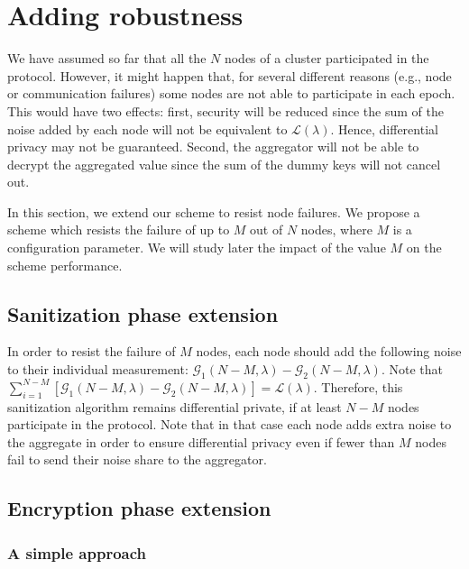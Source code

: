 \documentclass[11pt,a4paper]{article}
\theoremstyle{plain}
\theoremstyle{plain}
\theoremstyle{plain}
\theoremstyle{plain}
\theoremstyle{nonumberplain} \theoremseparator{}
\begin{document}
\section{Adding robustness}
\label{sec:robust}

We have assumed so far that all the $N$ nodes of a cluster
participated in the protocol. However, it might happen that, for
several different reasons (e.g., node or communication failures) some
nodes are not able to participate in each epoch. This would have two effects: first, 
security will be reduced since the sum of the noise added by each node will not be 
equivalent to $\mathcal{L}(\lambda)$. Hence, differential privacy may not be guaranteed.
Second, the aggregator will not be able to decrypt the aggregated value since the sum of 
the dummy keys will not cancel out.

In this section, we extend our scheme to resist node failures. We propose
a scheme which resists the failure of up to $M$ out of $N$ nodes, 
where $M$ is a configuration parameter. We will study later the
impact of the value $M$ on the scheme performance.


\subsection{Sanitization phase extension}

In order to resist the failure of $M$ nodes, each node should add the following
noise to their individual measurement: $\mathcal{G}_{1}(N-M, \lambda) - \mathcal{G}_{2}(N-M, \lambda)$. Note that
$\sum_{i=1}^{N-M} [\mathcal{G}_{1}(N-M, \lambda) - \mathcal{G}_{2}(N-M, \lambda)] = \mathcal{L}(\lambda)$. Therefore, this sanitization algorithm remains differential private, if at least $N-M$ nodes participate in the protocol. Note that in that case each node adds extra noise to the aggregate in order to ensure differential privacy even if fewer than $M$ nodes fail to send their noise share to the aggregator. 

\subsection{Encryption phase extension}
\subsubsection{A simple approach}
\end{document}
